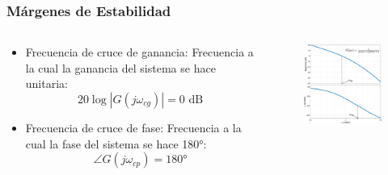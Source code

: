 \documentclass[aspectratio=169]{beamer}
\theoremstyle{definition}
\theoremstyle{plain}
\theoremstyle{remark}
\begin{document}
\begin{frame}[<+->]\frametitle{Márgenes de Estabilidad}
	\begin{columns}
		\begin{column}{0.45\textwidth}
			\begin{itemize}
				\item Frecuencia de cruce de ganancia: Frecuencia a la cual la ganancia del sistema se hace unitaria:
				\begin{equation*}
					20 \log |G(j\omega_{cg})| = 0 \text{ dB}
				\end{equation*}
				\item Frecuencia de cruce de fase: Frecuencia a la cual la fase del sistema se hace \ang{180}:
				\begin{equation*}
					\angle G(j\omega_{cp}) = \ang{180}
				\end{equation*}
			\end{itemize}
		\end{column}
		\begin{column}{0.55\textwidth}
		\begin{figure}
			\centering
			\includegraphics[width=7cm]{images/phaseGainCutFreqExample.eps}
		\end{figure}
		\end{column}
	\end{columns}	
\end{frame}
\end{document}
